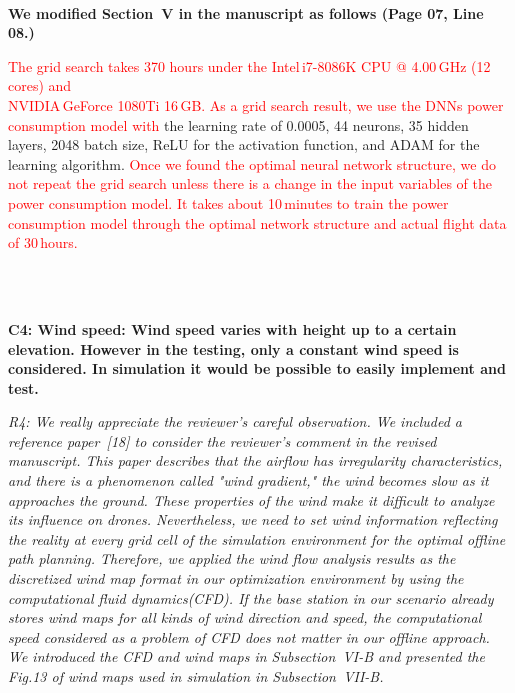 \documentclass[onecolumn]{IEEEconf}
\begin{document}
\begin{description}
    ~\\
    \textbf{We modified Section~V in the manuscript as follows (Page 07, Line 08.)}\\
    \begin{mdframed}[ linewidth=.75pt, userdefinedwidth=0.9\textwidth]
    \textcolor{red}{The grid search takes 370 hours under the Intel\textregistered \,i7-8086K CPU @ 4.00\,GHz (12 cores) and\\ NVIDIA\textregistered \,GeForce 1080Ti 16\,GB. 
    As a grid search result, we use the DNNs power consumption model with} the learning rate of 0.0005, 44 neurons, 35 hidden layers, 2048 batch size, ReLU for the activation function, and ADAM for the learning algorithm.
    \textcolor{red}{Once we found the optimal neural network structure, we do not repeat the grid search unless there is a change in the input variables of the power consumption model.
    It takes about 10\,minutes to train the power consumption model through the optimal network structure and actual flight data of 30\,hours.}
    \end{mdframed}
	~\\
	~\\
    \item \textbf
    {
	C4: Wind speed:
Wind speed varies with height up to a certain elevation. However in the testing, only a constant wind speed is considered. In simulation it would be possible to easily implement and test.
	}
	\item \textit
	{
	R4: We really appreciate the reviewer's careful observation. We included a reference paper~[18] to consider the reviewer's comment in the revised manuscript. This paper describes that the airflow has irregularity characteristics, and there is a phenomenon called "wind gradient," the wind becomes slow as it approaches the ground. These properties of the wind make it difficult to analyze its influence on drones. Nevertheless, we need to set wind information reflecting the reality at every grid cell of the simulation environment for the optimal offline path planning.
    Therefore, we applied the wind flow analysis results as the discretized wind map format in our optimization environment by using the computational fluid dynamics(CFD). If the base station in our scenario already stores wind maps for all kinds of wind direction and speed, the computational speed considered as a problem of CFD does not matter in our offline approach. We introduced the CFD and wind maps in Subsection~VI-B and presented the Fig.13 of wind maps used in simulation in Subsection~VII-B.
}
\end{description}
\end{document}

